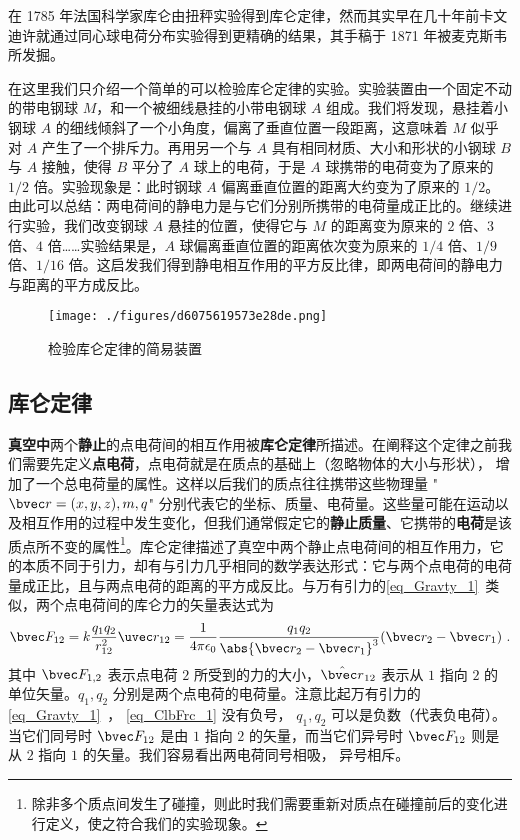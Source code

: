 

在 1785 年法国科学家库仑由扭秤实验得到库仑定律，然而其实早在几十年前卡文迪许就通过同心球电荷分布实验得到更精确的结果，其手稿于 1871 年被麦克斯韦所发掘。

在这里我们只介绍一个简单的可以检验库仑定律的实验。实验装置由一个固定不动的带电钢球 $M$，和一个被细线悬挂的小带电钢球 $A$ 组成。我们将发现，悬挂着小钢球 $A$ 的细线倾斜了一个小角度，偏离了垂直位置一段距离，这意味着 $M$ 似乎对 $A$ 产生了一个排斥力。再用另一个与 $A$ 具有相同材质、大小和形状的小钢球 $B$ 与 $A$ 接触，使得 $B$ 平分了 $A$ 球上的电荷，于是 $A$ 球携带的电荷变为了原来的 $1/2$ 倍。实验现象是：此时钢球 $A$ 偏离垂直位置的距离大约变为了原来的 $1/2$。由此可以总结：两电荷间的静电力是与它们分别所携带的电荷量成正比的。继续进行实验，我们改变钢球 $A$ 悬挂的位置，使得它与 $M$ 的距离变为原来的 $2$ 倍、$3$ 倍、$4$ 倍……实验结果是，$A$ 球偏离垂直位置的距离依次变为原来的 $1/4$ 倍、$1/9$ 倍、$1/16$ 倍。这启发我们得到静电相互作用的平方反比律，即两电荷间的静电力与距离的平方成反比。
\begin{figure}[ht]
\centering
\texttt{[image: ./figures/d6075619573e28de.png]}
\caption{检验库仑定律的简易装置} \label{fig_ClbFrc_1}
\end{figure}


\subsection{库仑定律}
\textbf{真空中}两个\textbf{静止}的点电荷间的相互作用被\textbf{库仑定律}所描述。在阐释这个定律之前我们需要先定义\textbf{点电荷}，点电荷就是在质点的基础上（忽略物体的大小与形状）， 增加了一个总电荷量的属性。这样以后我们的质点往往携带这些物理量 "$\bvec r=(x,y,z),m,q$" 分别代表它的坐标、质量、电荷量。这些量可能在运动以及相互作用的过程中发生变化，但我们通常假定它的\textbf{静止质量}、它携带的\textbf{电荷}是该质点所不变的属性\footnote{除非多个质点间发生了碰撞，则此时我们需要重新对质点在碰撞前后的变化进行定义，使之符合我们的实验现象。}。库仑定律描述了真空中两个静止点电荷间的相互作用力，它的本质不同于引力，却有与引力几乎相同的数学表达形式：它与两个点电荷的电荷量成正比，且与两点电荷的距离的平方成反比。与万有引力的\autoref{eq_Gravty_1}~类似，两个点电荷间的库仑力的矢量表达式为
\begin{equation}\label{eq_ClbFrc_1}
\bvec F_{12} = k\frac{q_1 q_2}{r_{12}^2} \uvec r_{12} = \frac{1}{4\pi\epsilon_0} \frac{q_1 q_2}{\abs{\bvec r_2 - \bvec r_1}^3}(\bvec r_2 - \bvec r_1)~.
\end{equation}
其中 $\bvec F_{1,2}$ 表示点电荷 $2$ 所受到的力的大小，$\hat{\bvec r}_{12}$ 表示从 $1$ 指向 $2$ 的单位矢量。$q_1, q_2$ 分别是两个点电荷的电荷量。注意比起万有引力的\autoref{eq_Gravty_1}~， \autoref{eq_ClbFrc_1} 没有负号， $q_1, q_2$ 可以是负数（代表负电荷）。当它们同号时 $\bvec F_{12}$ 是由 $1$ 指向 $2$ 的矢量，而当它们异号时 $\bvec F_{12}$ 则是从 $2$ 指向 $1$ 的矢量。我们容易看出两电荷同号相吸， 异号相斥。


